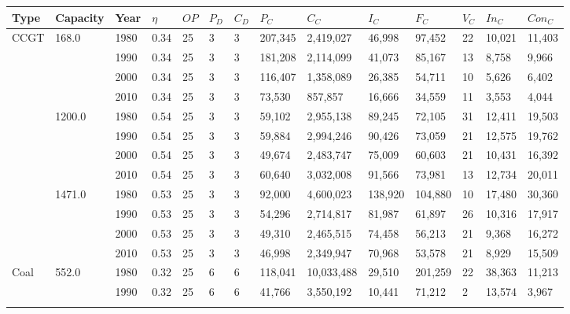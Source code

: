 \begin{table*}[]
	\begin{tabular}{|l|l|l|l|l|l|l|l|l|l|l|l|l|l|}
	\hline
	Type & Capacity & Year & $\eta$ & $OP$ & $P_D$ & $C_D$ & $P_C$ & $C_C$ & $I_C$ & $F_C$ & $V_C$ & $In_C$ & $Con_C$ \\ \hline
	\multirow{12}{*}{CCGT} & \multirow{4}{*}{168.0} & 1980 & 0.34 & 25 & 3 & 3 & 207,345 & 2,419,027 & 46,998 & 97,452 & 22 & 10,021 & 11,403 \\ \cline{3-14} 
	&  & 1990 & 0.34 & 25 & 3 & 3 & 181,208 & 2,114,099 & 41,073 & 85,167 & 13 & 8,758 & 9,966 \\ \cline{3-14} 
	&  & 2000 & 0.34 & 25 & 3 & 3 & 116,407 & 1,358,089 & 26,385 & 54,711 & 10 & 5,626 & 6,402 \\ \cline{3-14} 
	&  & 2010 & 0.34 & 25 & 3 & 3 & 73,530 & 857,857 & 16,666 & 34,559 & 11 & 3,553 & 4,044 \\ \cline{2-14} 
	& \multirow{4}{*}{1200.0} & 1980 & 0.54 & 25 & 3 & 3 & 59,102 & 2,955,138 & 89,245 & 72,105 & 31 & 12,411 & 19,503 \\ \cline{3-14} 
	&  & 1990 & 0.54 & 25 & 3 & 3 & 59,884 & 2,994,246 & 90,426 & 73,059 & 21 & 12,575 & 19,762 \\ \cline{3-14} 
	&  & 2000 & 0.54 & 25 & 3 & 3 & 49,674 & 2,483,747 & 75,009 & 60,603 & 21 & 10,431 & 16,392 \\ \cline{3-14} 
	&  & 2010 & 0.54 & 25 & 3 & 3 & 60,640 & 3,032,008 & 91,566 & 73,981 & 13 & 12,734 & 20,011 \\ \cline{2-14} 
	& \multirow{4}{*}{1471.0} & 1980 & 0.53 & 25 & 3 & 3 & 92,000 & 4,600,023 & 138,920 & 104,880 & 10 & 17,480 & 30,360 \\ \cline{3-14} 
	&  & 1990 & 0.53 & 25 & 3 & 3 & 54,296 & 2,714,817 & 81,987 & 61,897 & 26 & 10,316 & 17,917 \\ \cline{3-14} 
	&  & 2000 & 0.53 & 25 & 3 & 3 & 49,310 & 2,465,515 & 74,458 & 56,213 & 21 & 9,368 & 16,272 \\ \cline{3-14} 
	&  & 2010 & 0.53 & 25 & 3 & 3 & 46,998 & 2,349,947 & 70,968 & 53,578 & 21 & 8,929 & 15,509 \\ \hline
	\multirow{24}{*}{Coal} & \multirow{4}{*}{552.0} & 1980 & 0.32 & 25 & 6 & 6 & 118,041 & 10,033,488 & 29,510 & 201,259 & 22 & 38,363 & 11,213 \\ \cline{3-14} 
	&  & 1990 & 0.32 & 25 & 6 & 6 & 41,766 & 3,550,192 & 10,441 & 71,212 & 2 & 13,574 & 3,967 \\ \cline{3-14} 

\end{tabular}
\end{table*}
